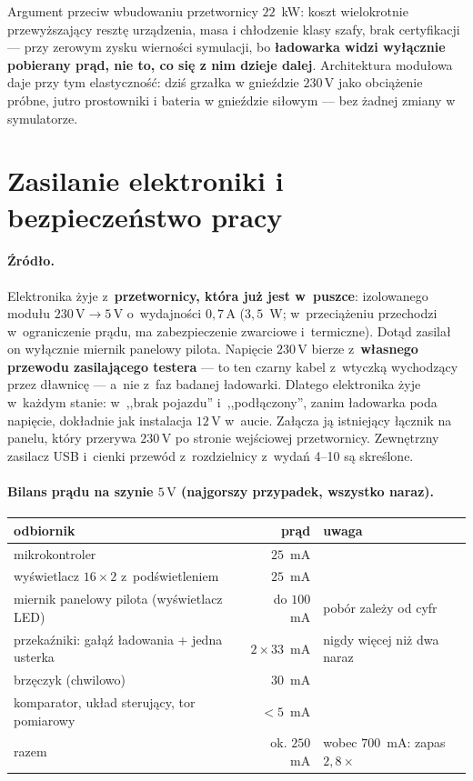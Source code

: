 \documentclass[a4paper,11pt]{article}
\newcommand{\volt}{\,\mathrm{V}}
\newcommand{\amp}{\,\mathrm{A}}
\begin{document}
Argument przeciw wbudowaniu przetwornicy $22$~kW: koszt wielokrotnie przewyższający
resztę urządzenia, masa i chłodzenie klasy szafy, brak certyfikacji --- przy zerowym
zysku wierności symulacji, bo \textbf{ładowarka widzi wyłącznie pobierany prąd, nie
to, co się z nim dzieje dalej}. Architektura modułowa daje przy tym elastyczność:
dziś grzałka w gnieździe $230\volt$ jako obciążenie próbne, jutro prostowniki
i bateria w gnieździe siłowym --- bez żadnej zmiany w symulatorze.

\section{Zasilanie elektroniki i bezpieczeństwo pracy}
\label{sec:zasilanie}

\paragraph{Źródło.} Elektronika żyje z~\textbf{przetwornicy, która już jest w~puszce}:
izolowanego modułu $230\volt\to5\volt$ o~wydajności $0{,}7\amp$ ($3{,}5$~W;
w~przeciążeniu przechodzi w~ograniczenie prądu, ma zabezpieczenie zwarciowe
i~termiczne). Dotąd zasilał on wyłącznie miernik panelowy pilota. Napięcie $230\volt$
bierze z~\textbf{własnego przewodu zasilającego testera} --- to ten czarny kabel
z~wtyczką wychodzący przez dławnicę --- a~nie z~faz badanej ładowarki. Dlatego
elektronika żyje w~każdym stanie: w~,,brak pojazdu'' i~,,podłączony'', zanim
ładowarka poda napięcie, dokładnie jak instalacja $12\volt$ w~aucie. Załącza ją
istniejący łącznik na panelu, który przerywa $230\volt$ po stronie wejściowej
przetwornicy. Zewnętrzny zasilacz USB i~cienki przewód z~rozdzielnicy z~wydań
4--10 są skreślone.

\paragraph{Bilans prądu na szynie $5\volt$ (najgorszy przypadek, wszystko naraz).}
\begin{center}
\begin{tabular}{lrl}
\hline
odbiornik & prąd & uwaga \\
\hline
mikrokontroler & $25$~mA & \\
wyświetlacz $16\times2$ z~podświetleniem & $25$~mA & \\
miernik panelowy pilota (wyświetlacz LED) & do $100$~mA & pobór zależy od cyfr \\
przekaźniki: gałąź ładowania + jedna usterka & $2\times33$~mA & nigdy więcej niż dwa naraz \\
brzęczyk (chwilowo) & $30$~mA & \\
komparator, układ sterujący, tor pomiarowy & $<5$~mA & \\
\hline
razem & ok. $250$~mA & wobec $700$~mA: zapas $2{,}8\times$ \\
\hline
\end{tabular}
\end{center}
\end{document}
